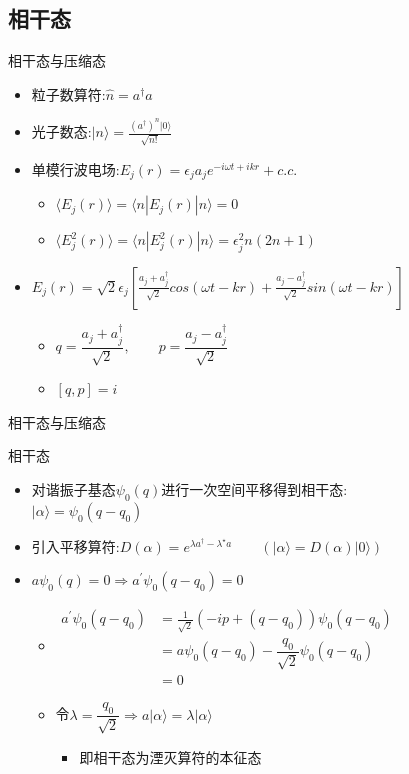 \documentclass{beamer}
\begin{document}
\subsection{相干态}
\begin{frame}{相干态与压缩态}
	\begin{itemize}
		\item 粒子数算符:$\hat{n}=a^{\dagger}a$
		\item 光子数态:$|n\rangle=\frac{(a^{\dagger})^{n}|0\rangle}{\sqrt{n!}}$
		\item 单模行波电场:$E_{j}(r)=\epsilon_{j}a_{j}e^{-i\omega t+ikr}+c.c.$
		\begin{itemize}
			\item $\langle E_{j}(r)\rangle=\langle n|E_{j}(r)|n\rangle=0$
			\item $\langle E_{j}^{2}(r)\rangle=\langle n|E_{j}^{2}(r)|n\rangle=\epsilon_{j}^{2}n(2n+1)$
		\end{itemize}
	\item $E_{j}(r)=\sqrt{2}\epsilon_{j}[\frac{a_{j}+a_{j}^{\dagger}}{\sqrt{2}}cos(\omega t-kr)+\frac{a_{j}-a_{j}^{\dagger}}{\sqrt{2}}sin(\omega t-kr)]$
	\begin{itemize}
		\item $q=\dfrac{a_{j}+a_{j}^{\dagger}}{\sqrt{2}},\qquad p=\dfrac{a_{j}-a_{j}^{\dagger}}{\sqrt{2}}$
		\item $[q,p]=i$
	\end{itemize}
	\end{itemize}
\end{frame}
\begin{frame}{相干态与压缩态}
	\begin{block}{相干态}
		\begin{itemize}
			\item 对谐振子基态$\psi_{0}(q)$进行一次空间平移得到相干态:\\$|\alpha\rangle=\psi_{0}(q-q_{0})$
			\item 引入平移算符:$D(\alpha)=e^{\lambda a^{\dagger}-\lambda^{\star}a}\qquad(|\alpha\rangle=D(\alpha)|0\rangle)$
			\item $a\psi_{0}(q)=0\Rightarrow a^{\prime}\psi_{0}(q-q_{0})=0$
			\begin{itemize}
				\item $\begin{aligned}
					a^{\prime}\psi_{0}(q-q_{0})&=\frac{1}{\sqrt{2}}(-ip+(q-q_{0}))\psi_{0}(q-q_{0})\\&=a\psi_{0}(q-q_{0})-\dfrac{q_{0}}{\sqrt{2}}\psi_{0}(q-q_{0})\\&=0
				\end{aligned}$ 
			\item 令$\lambda=\dfrac{q_{0}}{\sqrt{2}}\Rightarrow a|\alpha\rangle=\lambda|\alpha\rangle$
			\begin{itemize}
				\item 即相干态为湮灭算符的本征态
			\end{itemize}
			\end{itemize}
		\end{itemize}
	\end{block}
\end{frame}
\end{document}

